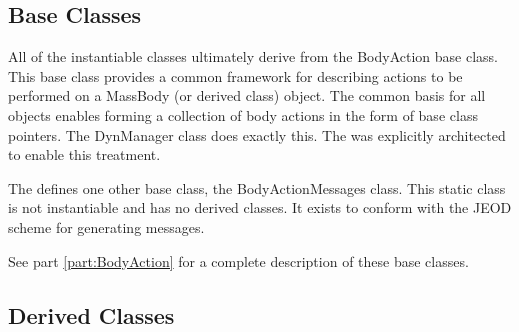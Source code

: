 \subsection{Base Classes}

All of the instantiable \ModelDesc classes ultimately derive from the
BodyAction base class. This base class provides a common framework for
describing actions to be performed on a MassBody (or derived class) object.
The common basis for all \ModelDesc objects enables forming a
collection of body actions in the form of base class pointers. The DynManager
class does exactly this. The \ModelDesc was explicitly architected to enable
this treatment.

The \ModelDesc defines one other base class, the BodyActionMessages class.
This static class is not instantiable and has no derived classes. It exists to
conform with the JEOD scheme for generating messages.

See part \ref{part:BodyAction} for a complete description of these
base classes.

\subsection{Derived Classes}

